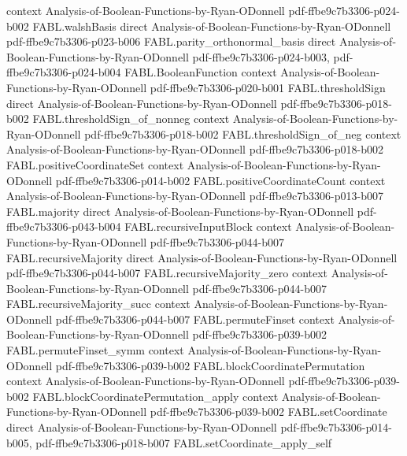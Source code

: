 \begin{theorem}
  {context}
  {Analysis-of-Boolean-Functions-by-Ryan-ODonnell}
  {pdf-ffbe9c7b3306-p024-b002}
\proofstep
  {FABL.walshBasis}
  {direct}
  {Analysis-of-Boolean-Functions-by-Ryan-ODonnell}
  {pdf-ffbe9c7b3306-p023-b006}
\proofstep
  {FABL.parity_orthonormal_basis}
  {direct}
  {Analysis-of-Boolean-Functions-by-Ryan-ODonnell}
  {pdf-ffbe9c7b3306-p024-b003,
    pdf-ffbe9c7b3306-p024-b004}
\proofstep
  {FABL.BooleanFunction}
  {context}
  {Analysis-of-Boolean-Functions-by-Ryan-ODonnell}
  {pdf-ffbe9c7b3306-p020-b001}
\proofstep
  {FABL.thresholdSign}
  {direct}
  {Analysis-of-Boolean-Functions-by-Ryan-ODonnell}
  {pdf-ffbe9c7b3306-p018-b002}
\proofstep
  {FABL.thresholdSign_of_nonneg}
  {context}
  {Analysis-of-Boolean-Functions-by-Ryan-ODonnell}
  {pdf-ffbe9c7b3306-p018-b002}
\proofstep
  {FABL.thresholdSign_of_neg}
  {context}
  {Analysis-of-Boolean-Functions-by-Ryan-ODonnell}
  {pdf-ffbe9c7b3306-p018-b002}
\proofstep
  {FABL.positiveCoordinateSet}
  {context}
  {Analysis-of-Boolean-Functions-by-Ryan-ODonnell}
  {pdf-ffbe9c7b3306-p014-b002}
\proofstep
  {FABL.positiveCoordinateCount}
  {context}
  {Analysis-of-Boolean-Functions-by-Ryan-ODonnell}
  {pdf-ffbe9c7b3306-p013-b007}
\proofstep
  {FABL.majority}
  {direct}
  {Analysis-of-Boolean-Functions-by-Ryan-ODonnell}
  {pdf-ffbe9c7b3306-p043-b004}
\proofstep
  {FABL.recursiveInputBlock}
  {context}
  {Analysis-of-Boolean-Functions-by-Ryan-ODonnell}
  {pdf-ffbe9c7b3306-p044-b007}
\proofstep
  {FABL.recursiveMajority}
  {direct}
  {Analysis-of-Boolean-Functions-by-Ryan-ODonnell}
  {pdf-ffbe9c7b3306-p044-b007}
\proofstep
  {FABL.recursiveMajority_zero}
  {context}
  {Analysis-of-Boolean-Functions-by-Ryan-ODonnell}
  {pdf-ffbe9c7b3306-p044-b007}
\proofstep
  {FABL.recursiveMajority_succ}
  {context}
  {Analysis-of-Boolean-Functions-by-Ryan-ODonnell}
  {pdf-ffbe9c7b3306-p044-b007}
\proofstep
  {FABL.permuteFinset}
  {context}
  {Analysis-of-Boolean-Functions-by-Ryan-ODonnell}
  {pdf-ffbe9c7b3306-p039-b002}
\proofstep
  {FABL.permuteFinset_symm}
  {context}
  {Analysis-of-Boolean-Functions-by-Ryan-ODonnell}
  {pdf-ffbe9c7b3306-p039-b002}
\proofstep
  {FABL.blockCoordinatePermutation}
  {context}
  {Analysis-of-Boolean-Functions-by-Ryan-ODonnell}
  {pdf-ffbe9c7b3306-p039-b002}
\proofstep
  {FABL.blockCoordinatePermutation_apply}
  {context}
  {Analysis-of-Boolean-Functions-by-Ryan-ODonnell}
  {pdf-ffbe9c7b3306-p039-b002}
\proofstep
  {FABL.setCoordinate}
  {direct}
  {Analysis-of-Boolean-Functions-by-Ryan-ODonnell}
  {pdf-ffbe9c7b3306-p014-b005,
    pdf-ffbe9c7b3306-p018-b007}
\proofstep
  {FABL.setCoordinate_apply_self}

\end{theorem}
